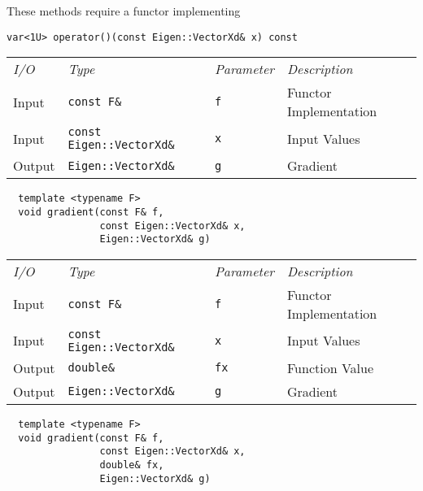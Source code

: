 These methods require a functor implementing
%
\begin{verbatim}
var<1U> operator()(const Eigen::VectorXd& x) const
\end{verbatim}

\begin{tcolorbox}[colback=white,colframe=gray90, coltitle=black,boxrule=3pt,
fonttitle=\bfseries,title=Gradient]

\begin{tabular}{llll}
\textit{I/O} & \textit{Type} & \textit{Parameter} & \textit{Description} \\
Input & \texttt{const F\&} & \texttt{f} & Functor Implementation \\
Input & \texttt{const Eigen::VectorXd\&} & \texttt{x} & Input Values \\
Output & \texttt{Eigen::VectorXd\&} & \texttt{g} & Gradient
\end{tabular}

\vspace{5mm}

\begin{verbatim}
  template <typename F>
  void gradient(const F& f,
                const Eigen::VectorXd& x,
                Eigen::VectorXd& g)
\end{verbatim}

\end{tcolorbox}

\begin{tcolorbox}[colback=white,colframe=gray90, coltitle=black,boxrule=3pt,
fonttitle=\bfseries,title=Gradient]

\begin{tabular}{llll}
\textit{I/O} & \textit{Type} & \textit{Parameter} & \textit{Description} \\
Input & \texttt{const F\&} & \texttt{f} & Functor Implementation \\
Input & \texttt{const Eigen::VectorXd\&} & \texttt{x} & Input Values \\
Output & \texttt{double\&} & \texttt{fx} & Function Value \\
Output & \texttt{Eigen::VectorXd\&} & \texttt{g} & Gradient
\end{tabular}

\vspace{5mm}

\begin{verbatim}
  template <typename F>
  void gradient(const F& f,
                const Eigen::VectorXd& x,
                double& fx,
                Eigen::VectorXd& g)
\end{verbatim}

\end{tcolorbox}

